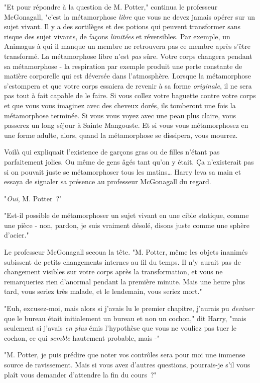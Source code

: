 "Et pour répondre à la question de M. Potter," continua le professeur McGonagall, "c'est la métamorphose \emph{libre} que vous ne devez jamais opérer sur un sujet vivant. Il y a des sortilèges et des potions qui peuvent transformer sans risque des sujet vivants, de façons \emph{limitées} et réversibles. Par exemple, un Animagus à qui il manque un membre ne retrouvera pas ce membre après s'être transformé. La métamorphose libre n'est \emph{pas} sûre. Votre corps changera pendant sa métamorphose - la respiration par exemple produit une perte constante de matière corporelle qui est déversée dans l'atmosphère. Lorsque la métamorphose s'estompera et que votre corps essaiera de revenir à sa forme \emph{originale}, il ne sera pas tout à fait capable de le faire. Si vous collez votre baguette contre votre corps et que vous vous imaginez avec des cheveux dorés, ils tomberont une fois la métamorphose terminée. Si vous vous voyez avec une peau plus claire, vous passerez un long séjour à Sainte Mangouste. Et si vous vous métamorphosez en une forme adulte, alors, quand la métamorphose se dissipera, vous mourrez.

Voilà qui expliquait l'existence de garçons gras ou de filles n'étant pas parfaitement jolies. Ou même de gens âgés tant qu'on y était. Ça n'existerait pas si on pouvait juste se métamorphoser tous les matins… Harry leva sa main et essaya de signaler sa présence au professeur McGonagall du regard.

"\emph{Oui}, M. Potter~?"

"Est-il possible de métamorphoser un sujet vivant en une cible statique, comme une pièce - non, pardon, je suis vraiment désolé, disons juste comme une sphère d'acier."

Le professeur McGonagall secoua la tête. "M. Potter, même les objets inanimés subissent de petits changements internes au fil du temps. Il n'y aurait pas de changement visibles sur votre corps après la transformation, et vous ne remarqueriez rien d'anormal pendant la première minute. Mais une heure plus tard, vous seriez très malade, et le lendemain, vous seriez mort."

"Euh, excusez-moi, mais alors si j'avais lu le premier chapitre, j'aurais pu \emph{deviner} que le bureau était initialement un bureau et non un cochon," dit Harry, "mais seulement si j'avais \emph{en plus} émis l'hypothèse que vous ne vouliez pas tuer le cochon, ce qui \emph{semble} hautement probable, mais -"

"M. Potter, je puis prédire que noter vos contrôles sera pour moi une immense source de ravissement. Mais si vous avez d'autres questions, pourrais-je s'il vous plaît vous demander d'attendre la fin du cours~?"

